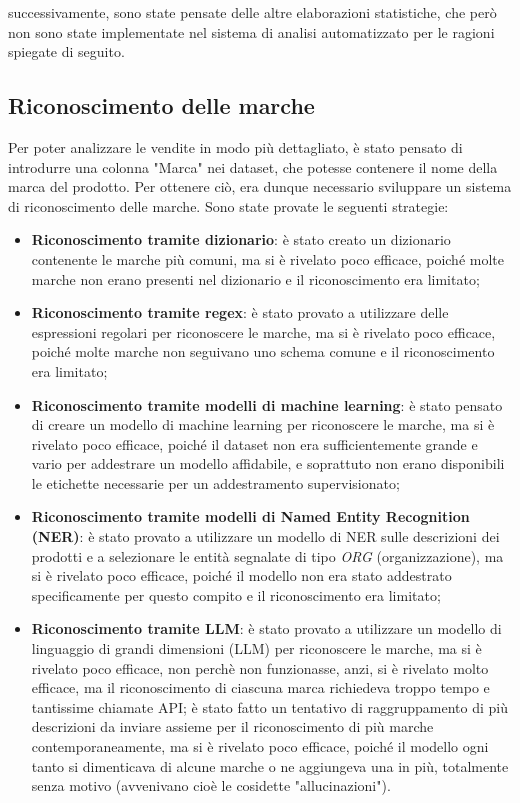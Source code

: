 successivamente, sono state pensate delle altre elaborazioni statistiche, che però non sono state implementate nel sistema di analisi automatizzato per le ragioni spiegate di seguito.

\subsection{Riconoscimento delle marche}
\label{sec:recognition-brands}

Per poter analizzare le vendite in modo più dettagliato, è stato pensato di introdurre una colonna "Marca" nei dataset, che potesse contenere il nome della marca del prodotto. Per ottenere ciò, era dunque necessario sviluppare un sistema di riconoscimento delle marche. Sono state provate le seguenti strategie:
\begin{itemize}
    \item \textbf{Riconoscimento tramite dizionario}: è stato creato un dizionario contenente le marche più comuni, ma si è rivelato poco efficace, poiché molte marche non erano presenti nel dizionario e il riconoscimento era limitato;
    \item \textbf{Riconoscimento tramite regex}: è stato provato a utilizzare delle espressioni regolari per riconoscere le marche, ma si è rivelato poco efficace, poiché molte marche non seguivano uno schema comune e il riconoscimento era limitato;
    \item \textbf{Riconoscimento tramite modelli di machine learning}: è stato pensato di creare un modello di machine learning per riconoscere le marche, ma si è rivelato poco efficace, poiché il dataset non era sufficientemente grande e vario per addestrare un modello affidabile, e soprattuto non erano disponibili le etichette necessarie per un addestramento supervisionato;
    \item \textbf{Riconoscimento tramite modelli di Named Entity Recognition (NER)}: è stato provato a utilizzare un modello di NER sulle descrizioni dei prodotti e a selezionare le entità segnalate di tipo \emph{ORG} (organizzazione), ma si è rivelato poco efficace, poiché il modello non era stato addestrato specificamente per questo compito e il riconoscimento era limitato;
    \item \textbf{Riconoscimento tramite LLM}: è stato provato a utilizzare un modello di linguaggio di grandi dimensioni (LLM) per riconoscere le marche, ma si è rivelato poco efficace, non perchè non funzionasse, anzi, si è rivelato molto efficace, ma il riconoscimento di ciascuna marca richiedeva troppo tempo e tantissime chiamate \gls{API}\glsfirstoccur{}; è stato fatto un tentativo di raggruppamento di più descrizioni da inviare assieme per il riconoscimento di più marche contemporaneamente, ma si è rivelato poco efficace, poiché il modello ogni tanto si dimenticava di alcune marche o ne aggiungeva una in più, totalmente senza motivo (avvenivano cioè le cosidette "allucinazioni").
\end{itemize}

